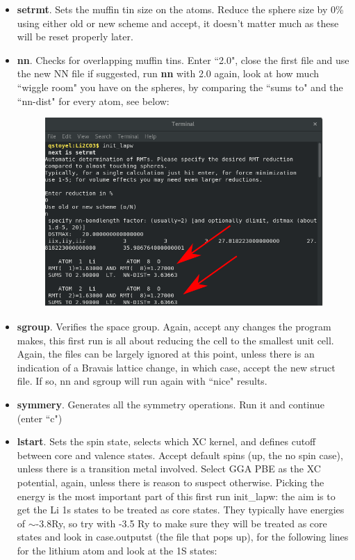 \documentclass[12pt]{article}
\begin{document}
\begin{itemize}
	\item \textbf{setrmt}. Sets the muffin tin size on the atoms.  Reduce the sphere size by 0\% using either old or new scheme and accept, it doesn't matter much as these will be reset properly later.
	\item  \textbf{nn}.  Checks for overlapping muffin tins. Enter ``2.0", close the first file and use the new NN file if suggested, run \textbf{nn} with 2.0 again, look at how much ``wiggle room" you have on the spheres, by comparing the ``sums to" and the ``nn-dist" for every atom, see below:
	
	\begin{figure}[H]
		\includegraphics[scale=0.4]{./images/init_lapw2.png}
	\end{figure}
	
	\item \textbf{sgroup}. Verifies the space group.  Again, accept any changes the program makes, this first run is all about reducing the cell to the smallest unit cell. Again, the files can be largely  ignored at this point, unless there is an indication of a Bravais lattice change, in which case, accept the new struct file. If so, nn and sgroup will run again with ``nice" results.  
	\item  \textbf{symmery}. Generates all the symmetry operations. Run it and continue (enter ``c")
	\item  \textbf{lstart}. Sets the spin state, selects which XC kernel, and defines cutoff between core and valence states.  Accept default spins (up, the no spin case), unless there is a transition metal involved. Select GGA PBE as the XC potential, again, unless there is reason to suspect otherwise. Picking the energy is the most important part of this first run init\_lapw: the aim is to get the Li 1s states to be treated as core states.  They typically have energies of $\sim$-3.8Ry, so try with -3.5 Ry to make sure they will be treated as core states and look in case.outputst (the file that pops up), for the following lines for the lithium atom and look at the 1S states:  
	

\end{itemize}
\end{document}
